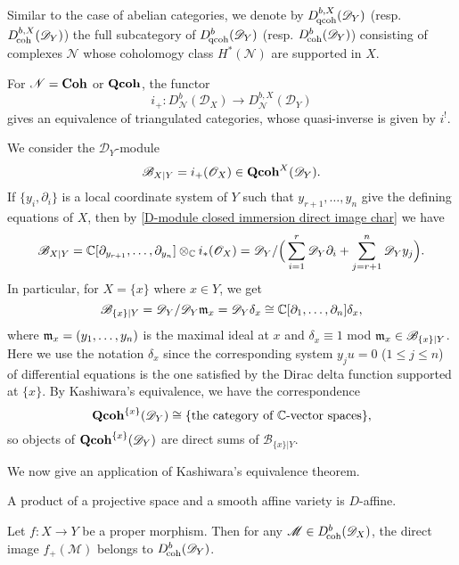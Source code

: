 Similar to the case of abelian categories, we denote by $D_{\!\mathrm{qcoh}}^{b,X}(\mathscr{D}_Y)$ (resp. $D_{\!\mathrm{coh}}^{b,X}(\mathscr{D}_Y)$) the full subcategory of $D_{\!\mathrm{qcoh}}^b(\mathscr{D}_Y)$ (resp. $D^b_{\!\mathrm{coh}}(\mathscr{D}_Y)$) consisting of complexes $\mathscr{N}$ whose coholomogy class $H^*(\mathscr{N})$ are supported in $X$.
\begin{corollary}\label{D-module closed immersion Kashiwara equivalence on triangle cat}
For $\mathscr{N}=\mathbf{Coh}$ or $\mathbf{Qcoh}$, the functor
\[i_+:D^b_\mathcal{N}(\mathscr{D}_X)\to D^{b,X}_\mathcal{N}(\mathscr{D}_Y)\]
gives an equivalence of triangulated categories, whose quasi-inverse is given by $i^!$.
\end{corollary}

\begin{example}
We consider the $\mathscr{D}_Y$-module
\[\mathscr{B}_{X|Y}=i_+(\mathscr{O}_X)\in \mathbf{Qcoh}^X(\mathscr{D}_Y).\]
If $\{y_i,\partial_i\}$ is a local coordinate system of $Y$ such that $y_{r+1},\dots,y_n$ give the defining equations of $X$, then by \cref{D-module closed immersion direct image char} we have
\[\mathscr{B}_{X|Y}=\mathbb{C}[\partial_{y_{r+1}},\dots,\partial_{y_n}]\otimes_{\mathbb{C}}i_*(\mathscr{O}_X)=\mathscr{D}_Y/\Big(\sum_{i=1}^{r}\mathscr{D}_Y\partial_i+\sum_{j=r+1}^n\mathscr{D}_Yy_j\Big).\]
In particular, for $X=\{x\}$ where $x\in Y$, we get
\[\mathscr{B}_{\{x\}|Y}=\mathscr{D}_Y/\mathscr{D}_Y\mathfrak{m}_x=\mathscr{D}_Y\delta_x\cong \mathbb{C}[\partial_1,\dots,\partial_n]\delta_x,\]
where $\mathfrak{m}_x=(y_1,\dots,y_n)$ is the maximal ideal at $x$ and $\delta_x\equiv 1$ mod $\mathfrak{m}_x\in\mathscr{B}_{\{x\}|Y}$. Here we use the notation $\delta_x$ since the corresponding system $y_ju=0$ ($1\leq j\leq n$) of differential equations is the one satisfied by the Dirac delta function supported at $\{x\}$. By Kashiwara's equivalence, we have the correspondence
\[\mathbf{Qcoh}^{\{x\}}(\mathscr{D}_Y)\cong \{\text{the category of $\mathbb{C}$-vector spaces}\},\]
so objects of $\mathbf{Qcoh}^{\{x\}}(\mathscr{D}_Y)$ are direct sums of $\mathscr{B}_{\{x\}|Y}$.
\end{example}

We now give an application of Kashiwara's equivalence theorem.
\begin{theorem}\label{D-module projective space D-affine}
A product of a projective space and a smooth affine variety is $D$-affine.
\end{theorem}

\begin{theorem}\label{D-module proper morphism direct image coherence}
Let $f:X\to Y$ be a proper morphism. Then for any $\mathscr{M}\in D^b_{\!\mathrm{coh}}(\mathscr{D}_X)$, the direct image $f_+(\mathscr{M})$ belongs to $D^b_{\!\mathrm{coh}}(\mathscr{D}_Y)$.
\end{theorem}

